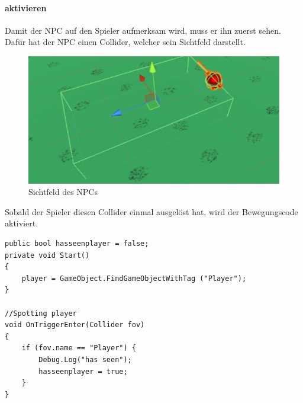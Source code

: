 \paragraph{aktivieren}
Damit der NPC auf den Spieler aufmerksam wird, muss er ihn zuerst sehen.
Dafür hat der NPC einen Collider, welcher sein Sichtfeld darstellt.
\begin{figure}[H]
\includegraphics[scale=1]{screenshots/fov.png}
\caption{Sichtfeld des NPCs}
\end{figure}
Sobald der Spieler diesen Collider einmal ausgelöst hat, wird der Bewegungscode aktiviert.
\begin{lstlisting}
public bool hasseenplayer = false;
private void Start()
{
	player = GameObject.FindGameObjectWithTag ("Player");
}
	
//Spotting player
void OnTriggerEnter(Collider fov)
{	
	if (fov.name == "Player") {
		Debug.Log("has seen");
		hasseenplayer = true;
	}
}
\end{lstlisting}
